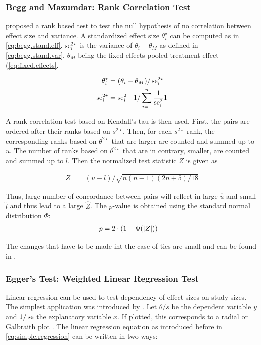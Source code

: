\documentclass[11pt,a4paper,twoside]{book}\usepackage[]{graphicx}\usepackage[]{color}
\begin{document}
\subsubsection{Begg and Mazumdar: Rank Correlation Test} \label{sec:Begg}
\citet{begg.ties} proposed a rank based test to test the null hypothesis of no correlation between effect size and variance.
A standardized effect size $\theta_i^\star$ can be computed as in \eqref{eq:begg.stand.eff}. $\operatorname{se}_i^{2\star}$ is the variance of $\theta_i - \theta_M$ as defined in \eqref{eq:begg.stand.var}, $\theta_M$ being the fixed effects pooled treatment effect (\eqref{eq:fixed.effects}. 

\begin{align}
\theta_i^\star &= (\theta_i - \theta_M)/\operatorname{se}_i^{2\star} \label{eq:begg.stand.eff}  \\
\operatorname{se}_i^{2\star} &= \operatorname{se}_i^2 - 1/\sum_{i = 1}^n\frac{1}{\operatorname{se}_i^2}1 \label{eq:begg.stand.var} 
\end{align}

A rank correlation test based on Kendall's tau is then used. First, the pairs are ordered after their ranks based on $s^{2\star}$. Then, for each $s^{2\star}$ rank, the corresponding ranks based on $\theta^{2\star}$ that are larger are counted and summed up to $u$. The number of ranks based on $\theta^{2\star}$ that are in contrary, smaller, are counted and summed up to $l$. Then the normalized test statistic $Z$ is given as

\begin{align}
Z &= (u - l)/\sqrt{n(n-1)(2n + 5)/18} \nonumber
\end{align}

Thus, large number of concordance between pairs will reflect in large $\hat{u}$ and small $\hat{l}$ and thus lead to a large $\hat{Z}$. The $p$-value is obtained using the standard normal distribution $\Phi$:
\begin{align}
p &= 2\cdot(1-\Phi(\left\lvert Z\right\rvert)) \nonumber
\end{align}

The changes that have to be made int the case of ties are small and can be found in \cite[410]{begg.ties}.


\subsubsection{Egger's Test: Weighted Linear Regression Test} \label{sec:Egger}
Linear regression can be used to test dependency of effect sizes on study sizes. The simplest application was introduced by \citet{Egger}.
Let $\theta/s$ be the dependent variable $y$ and $1/\operatorname{se}$ the explanatory variable $x$. If plotted, this corresponds to a radial or Galbraith plot \citep{galbraith}. The linear regression equation as introduced before in \eqref{eq:simple.regression} can be written in two ways:
\end{document}
